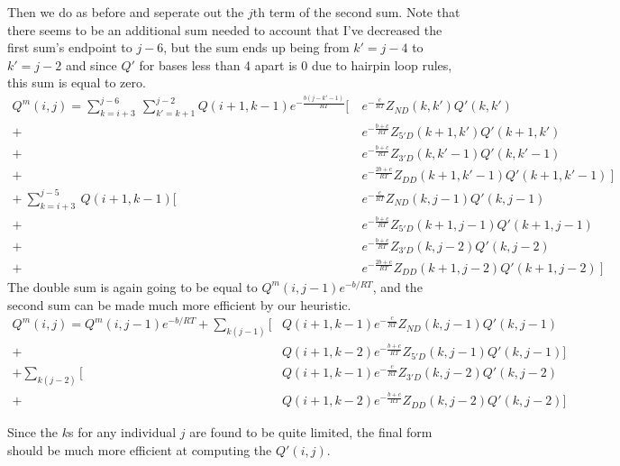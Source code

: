 \noindent
Then we do as before and seperate out the $j$th term of the second sum. Note that there seems to be an additional sum needed to account that I've decreased the first sum's endpoint to $j-6$, but the sum ends up being from $k'= j-4$ to $k' = j -2$ and since $Q'$ for bases less than 4 apart is 0 due to hairpin loop rules, this sum is equal to zero.
\begin{equation}
\begin{split}
Q^m(i, j) = \sum_{k = i + 3}^{j - 6}\  \sum_{k' = k + 1}^{j- 2} Q(i + 1, k - 1)  e^{-\frac{b(j - k'-1)}{RT} } \bigg [ \ 
  & e^{-\frac{c}{RT} }Z_{ND}(k, k') Q'(k, k') \\
+ \  & e^{-\frac{b + c}{RT}}Z_{5'D}(k + 1, k')Q'(k + 1, k') \\ 
+ \  & e^{-\frac{b + c}{RT}}Z_{3'D}(k, k'-1)Q'(k, k' - 1) \\
 + \  & e^{-\frac{2b + c}{RT}}Z_{DD}(k + 1, k'-1)Q'(k + 1, k'-1) \   \bigg ]\\
+ \ \sum_{k = i + 3}^{j - 5}\ Q(i + 1, k - 1)  \bigg [ \ 
  & e^{-\frac{c}{RT} }Z_{ND}(k, j-1) Q'(k, j-1)  \\
+ \  & e^{-\frac{b + c}{RT}}Z_{5'D}(k + 1, j-1)Q'(k + 1, j-1) \\ 
  + \ & e^{-\frac{b + c}{RT}}Z_{3'D}(k, j-2)Q'(k, j-2)\\
+ \  & e^{-\frac{2b + c}{RT}}Z_{DD}(k + 1, j-2)Q'(k + 1, j-2) \   \bigg ]\ 
\end{split}
\end{equation}
\noindent
The double sum is again going to be equal to $Q^m(i, j -1)e^{-b/RT}$, and the second sum can be made much more efficient by our heuristic. 
\begin{equation}
\begin{split}
Q^m(i, j) = Q^m(i, j - 1)e^{-b/RT} + \sum_{k(j - 1)} \bigg [ & Q(i + 1, k - 1)   
  e^{-\frac{c}{RT} }Z_{ND}(k, j-1) Q'(k, j-1)  \\
 + \ &Q(i + 1, k - 2) e^{-\frac{b + c}{RT}}Z_{5'D}(k, j-1)Q'(k, j-1)  \bigg ]\ \\
+ \sum_{k(j-2)} \bigg [ & Q(i + 1, k - 1)   
  e^{-\frac{c}{RT} }Z_{3'D}(k, j-2) Q'(k, j-2)  \\
  +\ &Q(i + 1, k - 2) e^{-\frac{b + c}{RT}}Z_{DD}(k, j-2)Q'(k, j-2)  \bigg ]
\end{split}
\end{equation}
\noindent

Since the $k$s for any individual $j$ are found to be quite limited, the final form should be much more efficient at computing the $Q'(i, j)$.

